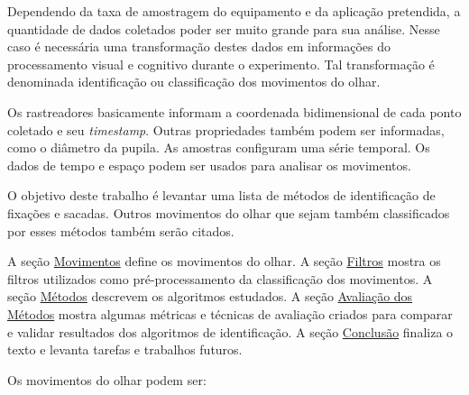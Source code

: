 \documentclass[brazil,]{report}
\begin{document}
Dependendo da taxa de amostragem do equipamento e da aplicação
pretendida, a quantidade de dados coletados poder ser muito grande para
sua análise. Nesse caso é necessária uma transformação destes dados em
informações do processamento visual e cognitivo durante o experimento.
Tal transformação é denominada identificação ou classificação dos
movimentos do olhar.

Os rastreadores basicamente informam a coordenada bidimensional de cada
ponto coletado e seu \emph{timestamp}. Outras propriedades também podem
ser informadas, como o diâmetro da pupila. As amostras configuram uma
série temporal. Os dados de tempo e espaço podem ser usados para
analisar os movimentos.

O objetivo deste trabalho é levantar uma lista de métodos de
identificação de fixações e sacadas. Outros movimentos do olhar que
sejam também classificados por esses métodos também serão citados.

A seção \hyperref[movimentos]{Movimentos} define os movimentos do olhar.
A seção \hyperref[filtros]{Filtros} mostra os filtros utilizados como
pré-processamento da classificação dos movimentos. A seção
\hyperref[muxe9todos]{Métodos} descrevem os algoritmos estudados. A
seção \hyperref[avaliauxe7uxe3o-dos-muxe9todos]{Avaliação dos Métodos}
mostra algumas métricas e técnicas de avaliação criados para comparar e
validar resultados dos algoritmos de identificação. A seção
\hyperref[conclusuxe3o]{Conclusão} finaliza o texto e levanta tarefas e
trabalhos futuros.


Os movimentos do olhar podem ser:
\end{document}
